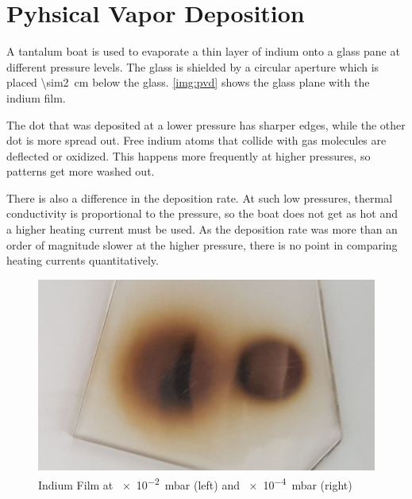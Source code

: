 \chapter{Pyhsical Vapor Deposition}

A tantalum boat is used to evaporate a thin layer of indium onto a glass pane at different pressure levels.
The glass is shielded by a circular aperture which is placed \SI{\sim2}{\cm} below the glass.
\autoref{img:pvd} shows the glass plane with the indium film.

The dot that was deposited at a lower pressure has sharper edges, while the other dot is more spread out.
Free indium atoms that collide with gas molecules are deflected or oxidized.
This happens more frequently at higher pressures, so patterns get more washed out.

There is also a difference in the deposition rate.
At such low pressures, thermal conductivity is proportional to the pressure, so the boat does not get as hot and a higher heating current must be used.
As the deposition rate was more than an order of magnitude slower at the higher pressure, there is no point in comparing heating currents quantitatively.

\begin{figure}[b!]
	\centering
	\includegraphics[width=.6\textwidth]{img/pvd.jpg}
	\caption[Indium Film]{Indium Film at \SI{e-2}{\milli\bar} (left) and \SI{e-4}{\milli\bar} (right)}
	\label{img:pvd}
\end{figure}
